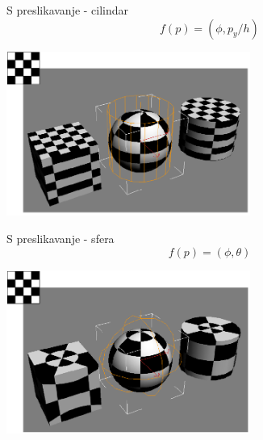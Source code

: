 \documentclass[9pt]{beamer}
\begin{document}
\begin{frame}{S preslikavanje - cilindar}
	$$ f(p) = (\phi, p_{y}/h)$$ 
	\begin{center}
		\includegraphics[width=8cm]{slike/02_projekcije_cylindrical.png}
	\end{center}
\end{frame}
%
\begin{frame}{S preslikavanje - sfera}
	$$ f(p) = (\phi, \theta)$$ 
	\begin{center}
		\includegraphics[width=8cm]{slike/02_projekcije_spherical.png}
	\end{center}
\end{frame}
\end{document}
